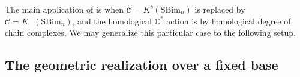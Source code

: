\documentclass[12pt]{amsart}
\numberwithin{equation}{section}
\newtheorem{proposition}[theorem]{Proposition}
\theoremstyle{definition}
\theoremstyle{remark}
\DeclareMathOperator{\Cone}{Cone}
\newcommand{\CC}{\mathbb{C}}
\newcommand{\cat}{\mathcal{C}}
\newcommand{\bcat}{\overline{\cat}}
\renewcommand{\1}{\mathbf{1}}
\newcommand{\e}{\mathrm{End}}
\newcommand{\SBim}{\mathrm{SBim}}
\begin{document}


The main application of \cite{EH} is when $\cat = K^b(\SBim_n)$ is replaced by $\bcat = K^-(\SBim_n)$, and the homological $\CC^*$ action is by homological degree of chain complexes. We may generalize this particular case to the following setup.



\subsection{The geometric realization over a fixed base}
\label{sub:geometric diagonalization}
\end{document}
